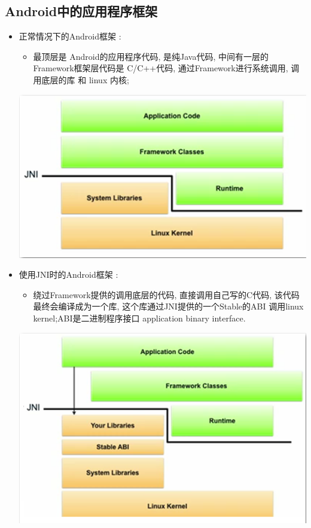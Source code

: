 \documentclass[9pt, b5paper]{article}
\begin{document}
\subsection{Android中的应用程序框架}
\label{sec-1-2}
\begin{itemize}
\item 正常情况下的Android框架 : 
\begin{itemize}
\item 最顶层是 Android的应用程序代码, 是纯Java代码, 中间有一层的 Framework框架层代码是 C/C++代码, 通过Framework进行系统调用, 调用底层的库 和 linux 内核;
\end{itemize}
\includegraphics[width=.9\linewidth]{./pic/androidFramework.png}
\item 使用JNI时的Android框架 : 
\begin{itemize}
\item 绕过Framework提供的调用底层的代码, 直接调用自己写的C代码, 该代码最终会编译成为一个库, 这个库通过JNI提供的一个Stable的ABI 调用linux kernel;ABI是二进制程序接口 application binary interface.
\end{itemize}
\includegraphics[width=.9\linewidth]{./pic/androidFrameworkJNI.png}
\end{itemize}
\end{document}
